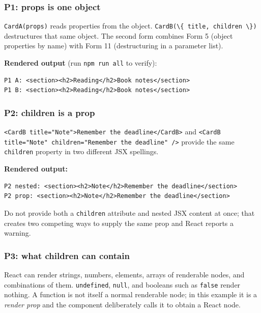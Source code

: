 \documentclass[
]{article}
\newcommand{\passthrough}[1]{#1}
\begin{document}
\subsubsection{P1: props is one object}\label{p1-props-is-one-object}

\passthrough{\lstinline!CardA(props)!} reads properties from the object.
\passthrough{\lstinline!CardB(\{ title, children \})!} destructures that
same object. The second form combines Form 5 (object properties by name)
with Form 11 (destructuring in a parameter list).

\textbf{Rendered output} (run \passthrough{\lstinline!npm run all!} to
verify):

\begin{lstlisting}
P1 A: <section><h2>Reading</h2>Book notes</section>
P1 B: <section><h2>Reading</h2>Book notes</section>
\end{lstlisting}

\subsubsection{P2: children is a prop}\label{p2-children-is-a-prop}

\passthrough{\lstinline!<CardB title="Note">Remember the deadline</CardB>!}
and
\passthrough{\lstinline!<CardB title="Note" children="Remember the deadline" />!}
provide the same \passthrough{\lstinline!children!} property in two
different JSX spellings.

\textbf{Rendered output:}

\begin{lstlisting}
P2 nested: <section><h2>Note</h2>Remember the deadline</section>
P2 prop: <section><h2>Note</h2>Remember the deadline</section>
\end{lstlisting}

Do not provide both a \passthrough{\lstinline!children!} attribute and
nested JSX content at once; that creates two competing ways to supply
the same prop and React reports a warning.

\subsubsection{P3: what children can
contain}\label{p3-what-children-can-contain}

React can render strings, numbers, elements, arrays of renderable nodes,
and combinations of them. \passthrough{\lstinline!undefined!},
\passthrough{\lstinline!null!}, and booleans such as
\passthrough{\lstinline!false!} render nothing. A function is not itself
a normal renderable node; in this example it is a \emph{render prop} and
the component deliberately calls it to obtain a React node.
\end{document}
